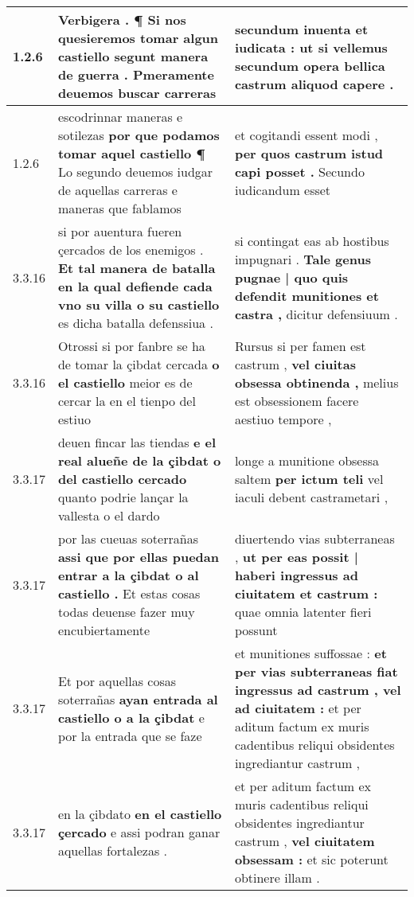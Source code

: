 \begin{tabular}{|p{1cm}|p{6.5cm}|p{6.5cm}|}

\hline
1.2.6 & Verbigera . ¶ \textbf{ Si nos quesieremos tomar algun castiello } segunt manera de guerra . Pmeramente deuemos buscar carreras & secundum inuenta et iudicata : \textbf{ ut si vellemus } secundum opera bellica castrum aliquod capere . \\\hline
1.2.6 & escodrinnar maneras e sotilezas \textbf{ por que podamos tomar aquel castiello ¶ } Lo segundo deuemos iudgar de aquellas carreras e maneras que fablamos & et cogitandi essent modi , \textbf{ per quos castrum istud capi posset . } Secundo iudicandum esset \\\hline
3.3.16 & si por auentura fueren çercados de los enemigos . \textbf{ Et tal manera de batalla en la qual defiende cada vno su villa o su castiello } es dicha batalla defenssiua . & si contingat eas ab hostibus impugnari . \textbf{ Tale genus pugnae | quo quis defendit munitiones et castra , } dicitur defensiuum . \\\hline
3.3.16 & Otrossi si por fanbre se ha de tomar la çibdat cercada \textbf{ o el castiello } meior es de cercar la en el tienpo del estiuo & Rursus si per famen est castrum , \textbf{ vel ciuitas obsessa obtinenda , } melius est obsessionem facere aestiuo tempore , \\\hline
3.3.17 & deuen fincar las tiendas \textbf{ e el real alueñe de la çibdat o del castiello cercado } quanto podrie lançar la vallesta o el dardo & longe a munitione obsessa saltem \textbf{ per ictum teli } vel iaculi debent castrametari , \\\hline
3.3.17 & por las cueuas soterrañas \textbf{ assi que por ellas puedan entrar a la çibdat o al castiello . } Et estas cosas todas deuense fazer muy encubiertamente & diuertendo vias subterraneas , \textbf{ ut per eas possit | haberi ingressus ad ciuitatem et castrum : } quae omnia latenter fieri possunt \\\hline
3.3.17 & Et por aquellas cosas soterrañas \textbf{ ayan entrada al castiello o a la çibdat } e por la entrada que se faze & et munitiones suffossae : \textbf{ et per vias subterraneas fiat ingressus ad castrum , vel ad ciuitatem : } et per aditum factum ex muris cadentibus reliqui obsidentes ingrediantur castrum , \\\hline
3.3.17 & en la çibdato \textbf{ en el castiello çercado } e assi podran ganar aquellas fortalezas . & et per aditum factum ex muris cadentibus reliqui obsidentes ingrediantur castrum , \textbf{ vel ciuitatem obsessam : } et sic poterunt obtinere illam . \\\hline

\end{tabular}
